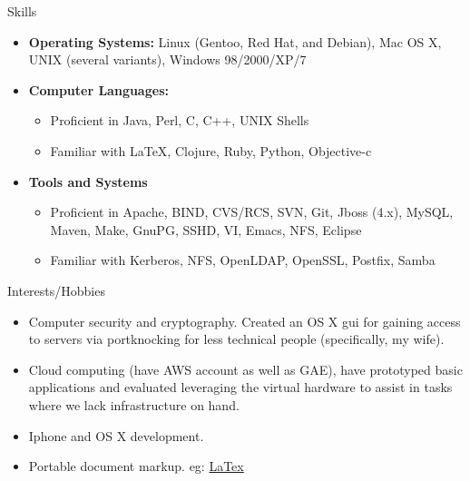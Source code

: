 \documentclass[11pt,oneside]{article}
\newenvironment{ressection}[1]{
	\vspace{4pt}
	{\fontfamily{phv}\selectfont\Large#1}
	\begin{itemize}
	\vspace{3pt}
}{
	\end{itemize}
}
\newcommand{\resitem}[1]{
	\vspace{-4pt}
	\item \begin{flushleft} #1 \end{flushleft}
}
\newcommand{\ressubitem}[1]{
	\vspace{-1pt}
	\item \begin{flushleft} #1 \end{flushleft}
}
\newenvironment{reslist}[1]{
	\resitem{\textbf{#1}}
	\vspace{-5pt}
	\begin{itemize}
}{
	\end{itemize}
}
\begin{document}
\begin{ressection}{Skills}
  
  \resitem{\textbf{Operating Systems:} Linux (Gentoo, Red Hat, and
    Debian), Mac OS X, UNIX (several variants), Windows 98/2000/XP/7}
  
  \begin{reslist}{Computer Languages:}
    
    \ressubitem{Proficient in Java, Perl, C, C++,  UNIX Shells}
    
    \ressubitem{Familiar with \LaTeX, Clojure, Ruby, Python, Objective-c}
    
  \end{reslist}

  \begin{reslist}{Tools and Systems}
    
    \ressubitem{Proficient in Apache, BIND, CVS/RCS, SVN, Git, Jboss
      (4.x), MySQL, Maven, Make, GnuPG, SSHD, VI, Emacs, NFS, Eclipse}
    
    \ressubitem{Familiar with Kerberos, NFS, OpenLDAP, OpenSSL, Postfix, Samba}
    
  \end{reslist}
  
  
\end{ressection}


\begin{ressection}{Interests/Hobbies}
  
  \resitem{Computer security and cryptography. Created an OS X gui for
    gaining access to servers via portknocking for less technical
    people (specifically, my wife).}

  \resitem{Cloud computing (have AWS account as well as GAE), have
    prototyped basic applications and evaluated leveraging the virtual
    hardware to assist in tasks where we lack infrastructure on hand.}

  \resitem{Iphone and OS X development.}
  
  \resitem{Portable document markup. eg: \href{https://github.com/jstelzer/Resume/blob/master/stelzer-res.tex}{LaTex}}
  
\end{ressection}
\end{document}
